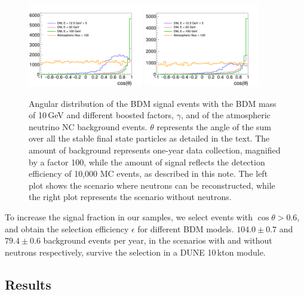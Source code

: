 \begin{figure}[!htb]
\centering
\includegraphics[width=0.45\textwidth]{graphics/m10_SmearedReconstructableAngle.png}
\includegraphics[width=0.45\textwidth]{graphics/m10_SmearedReconstructableNoNAngle.png}
\caption{Angular distribution of the BDM signal events with the BDM mass of 10\,GeV
and different boosted factors, $\gamma$, and of the atmospheric neutrino NC
background events.
$\theta$ represents the angle of the sum over all the stable final state
particles as detailed in the text.
The amount of background represents one-year data collection, magnified by a factor 100,
while the amount of signal reflects the detection efficiency of 10,000 MC events, as
described in this note.
The left plot shows the scenario where neutrons can be reconstructed,
while the right plot represents the scenario without neutrons.}
\label{fig:m10_SmearedReconstructableAngle}
\end{figure}


To increase the signal fraction in our samples, we select events with $\cos\theta > 0.6$,
and obtain the selection efficiency $\epsilon$ for different BDM models.
$104.0 \pm 0.7$ and $79.4 \pm 0.6$ background events per year, in the scenarios with and without neutrons respectively,
survive the selection in a DUNE 10\,kton module.

\subsection{Results}

